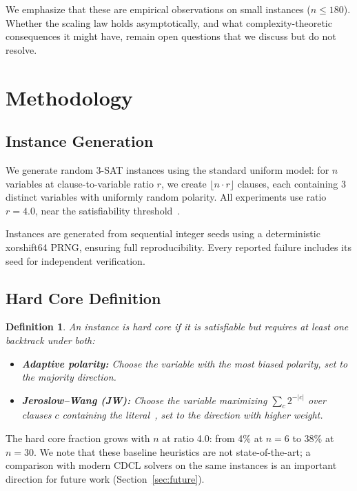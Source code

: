 \documentclass[11pt,a4paper]{article}
\newtheorem{definition}{Definition}
\begin{document}
We emphasize that these are empirical observations on small instances ($n \leq 180$). Whether the scaling law holds asymptotically, and what complexity-theoretic consequences it might have, remain open questions that we discuss but do not resolve.

\section{Methodology}

\subsection{Instance Generation}

We generate random 3-SAT instances using the standard uniform model: for $n$ variables at clause-to-variable ratio $r$, we create $\lfloor n \cdot r \rfloor$ clauses, each containing 3 distinct variables with uniformly random polarity. All experiments use ratio $r = 4.0$, near the satisfiability threshold~\citep{dingsly2015proof}.

Instances are generated from sequential integer seeds using a deterministic xorshift64 PRNG, ensuring full reproducibility. Every reported failure includes its seed for independent verification.

\subsection{Hard Core Definition}

\begin{definition}
An instance is \emph{hard core} if it is satisfiable but requires at least one backtrack under both:
\begin{itemize}
    \item \textbf{Adaptive polarity:} Choose the variable with the most biased polarity, set to the majority direction.
    \item \textbf{Jeroslow--Wang (JW):} Choose the variable maximizing $\sum_c 2^{-|c|}$ over clauses $c$ containing the literal~\citep{jeroslow1990solving}, set to the direction with higher weight.
\end{itemize}
\end{definition}

The hard core fraction grows with $n$ at ratio 4.0: from 4\% at $n = 6$ to 38\% at $n = 30$. We note that these baseline heuristics are not state-of-the-art; a comparison with modern CDCL solvers on the same instances is an important direction for future work (Section~\ref{sec:future}).
\end{document}
